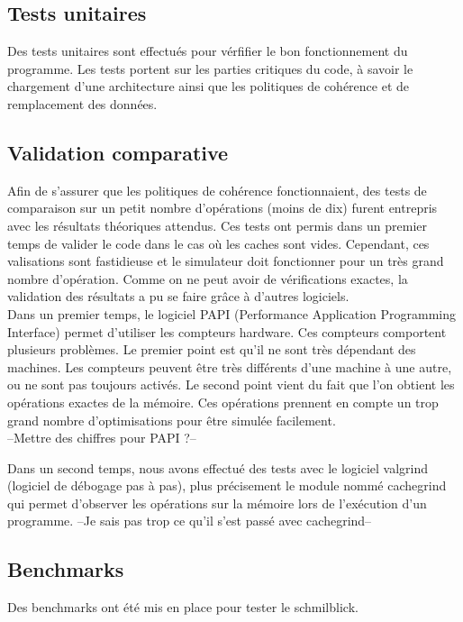 \subsection{Tests unitaires}

Des tests unitaires sont effectués pour vérfifier le bon fonctionnement du programme. Les tests portent sur les parties critiques du code, à savoir le chargement d'une architecture ainsi que les politiques de cohérence et de remplacement des données.

\subsection{Validation comparative}

Afin de s'assurer que les politiques de cohérence fonctionnaient, des tests de comparaison sur un petit nombre d'opérations (moins de dix) furent entrepris avec les résultats théoriques attendus. Ces tests ont permis dans un premier temps de valider le code dans le cas où les caches sont vides. Cependant, ces valisations sont fastidieuse et le simulateur doit fonctionner pour un très grand nombre d'opération. Comme on ne peut avoir de vérifications exactes, la validation des résultats a pu se faire grâce à d'autres logiciels.\\

Dans un premier temps, le logiciel PAPI (Performance Application Programming Interface) permet d'utiliser les compteurs hardware. Ces compteurs comportent plusieurs problèmes. Le premier point est qu'il ne sont très dépendant des machines. Les compteurs peuvent être très différents d'une machine à une autre, ou ne sont pas toujours activés. Le second point vient du fait que l'on obtient les opérations exactes de la mémoire. Ces opérations prennent en compte un trop grand nombre d'optimisations pour être simulée facilement.\\

--Mettre des chiffres pour PAPI ?--

Dans un second temps, nous avons effectué des tests avec le logiciel valgrind (logiciel de débogage pas à pas), plus précisement le module nommé cachegrind qui permet d'observer les opérations sur la mémoire lors de l'exécution d'un programme.
--Je sais pas trop ce qu'il s'est passé avec cachegrind--

\subsection{Benchmarks}

Des benchmarks ont été mis en place pour tester le schmilblick.
